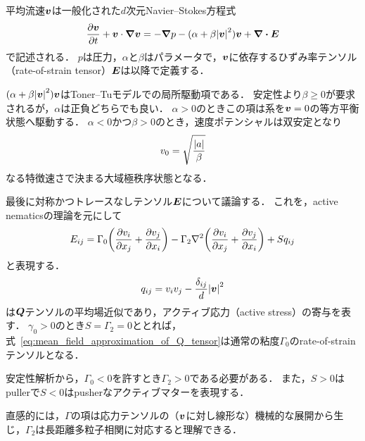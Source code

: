 \documentclass[12pt,dvipdfmx,svgnames,a4paper,uplatex]{ujarticle}
\theoremstyle{plain}
\begin{document}
平均流速\(\vb*{v}\)は一般化された\(d\)次元Navier--Stokes方程式
\begin{equation}
  \pdv{\vb*{v}}{t} + \vb*{v} \cdot \grad{\vb*{v}} = -\grad{p} - (\alpha + \beta \abs{\vb*{v}}^2) \vb*{v} + \div{\vb*{E}}
  \label{eq:generalised_NS}
\end{equation}
で記述される．
\(p\)は圧力，\(\alpha\)と\(\beta\)はパラメータで，\(\vb*{v}\)に依存するひずみ率テンソル（rate-of-strain tensor）\(\vb*{E}\)は以降で定義する．

\((\alpha + \beta \abs{\vb*{v}}^2) \vb*{v}\)はToner--Tuモデルでの局所駆動項である．
安定性より\(\beta \ge 0\)が要求されるが，\(\alpha\)は正負どちらでも良い．
\(\alpha > 0\)のときこの項は系を\(\vb*{v}=0\)の等方平衡状態へ駆動する．
\(\alpha < 0\)かつ\(\beta > 0\)のとき，速度ポテンシャルは双安定となり
\begin{equation}
  v_0 = \sqrt{\frac{\abs{a}}{\beta}}
  \label{eq:bistable_velocity_potential}
\end{equation}
なる特徴速さで決まる大域極秩序状態となる．

最後に対称かつトレースなしテンソル\(\vb*{E}\)について議論する．
これを，active nematicsの理論を元にして
\begin{equation}
  E_{ij} = \Gamma_0 \qty(\pdv{v_i}{x_j} + \pdv{v_j}{x_i}) - \Gamma_2 \laplacian \qty(\pdv{v_i}{x_j} + \pdv{v_j}{x_i}) + S q_{ij}
  \label{eq:rate-of-strain_tensor}
\end{equation}
と表現する．
\begin{equation}
  q_{ij} = v_i v_j - \frac{\delta_{ij}}{d} \abs{\vb*{v}}^2
  \label{eq:mean_field_approximation_of_Q_tensor}
\end{equation}
は\(\vb*{Q}\)テンソルの平均場近似であり，アクティブ応力（active stress）の寄与を表す．
\(\gamma_0 > 0\)のとき\(S=\Gamma_2=0\)ととれば，式~\ref{eq:mean_field_approximation_of_Q_tensor}は通常の粘度\(\Gamma_0\)のrate-of-strainテンソルとなる．

安定性解析から，\(\Gamma_0 < 0\)を許すとき\(\Gamma_2 > 0\)である必要がある．
また，\(S>0\)はpullerで\(S<0\)はpusherなアクティブマターを表現する．

直感的には，\(\Gamma\)の項は応力テンソルの（\(\vb*{v}\)に対し線形な）機械的な展開から生じ，\(\Gamma_2\)は長距離多粒子相関に対応すると理解できる．
\end{document}
